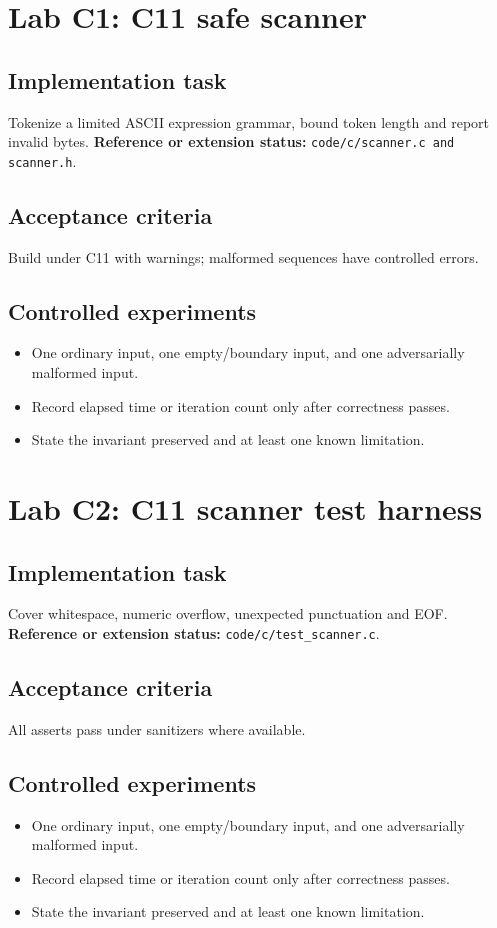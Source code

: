\documentclass[10pt,letterpaper]{article}
\begin{document}
\section{Lab C1: C11 safe scanner}
\subsection{Implementation task}
Tokenize a limited ASCII expression grammar, bound token length and report invalid bytes.
\textbf{Reference or extension status:} \nolinkurl{code/c/scanner.c and scanner.h}.\par\subsection{Acceptance criteria}
Build under C11 with warnings; malformed sequences have controlled errors.
\subsection{Controlled experiments}
\begin{itemize}
\item One ordinary input, one empty/boundary input, and one adversarially malformed input.
\item Record elapsed time or iteration count only after correctness passes.
\item State the invariant preserved and at least one known limitation.
\end{itemize}


\section{Lab C2: C11 scanner test harness}
\subsection{Implementation task}
Cover whitespace, numeric overflow, unexpected punctuation and EOF.
\textbf{Reference or extension status:} \nolinkurl{code/c/test_scanner.c}.\par\subsection{Acceptance criteria}
All asserts pass under sanitizers where available.
\subsection{Controlled experiments}
\begin{itemize}
\item One ordinary input, one empty/boundary input, and one adversarially malformed input.
\item Record elapsed time or iteration count only after correctness passes.
\item State the invariant preserved and at least one known limitation.
\end{itemize}
\end{document}
